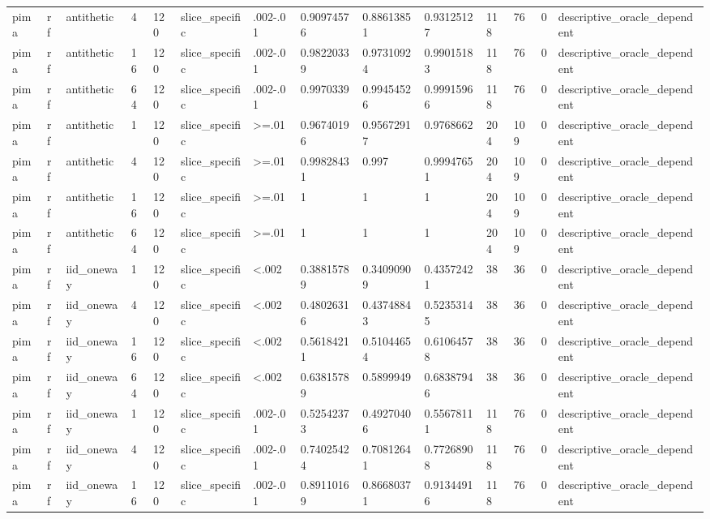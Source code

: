 \begin{tabular}{llllllllllllll}
pima & rf & antithetic & 4 & 120 & slice\_specific & .002-.01 & 0.90974576 & 0.88613851 & 0.93125127 & 118 & 76 & 0 & descriptive\_oracle\_dependent \\
pima & rf & antithetic & 16 & 120 & slice\_specific & .002-.01 & 0.98220339 & 0.97310924 & 0.99015183 & 118 & 76 & 0 & descriptive\_oracle\_dependent \\
pima & rf & antithetic & 64 & 120 & slice\_specific & .002-.01 & 0.9970339 & 0.99454526 & 0.99915966 & 118 & 76 & 0 & descriptive\_oracle\_dependent \\
pima & rf & antithetic & 1 & 120 & slice\_specific & >=.01 & 0.96740196 & 0.95672917 & 0.9768662 & 204 & 109 & 0 & descriptive\_oracle\_dependent \\
pima & rf & antithetic & 4 & 120 & slice\_specific & >=.01 & 0.99828431 & 0.997 & 0.99947651 & 204 & 109 & 0 & descriptive\_oracle\_dependent \\
pima & rf & antithetic & 16 & 120 & slice\_specific & >=.01 & 1 & 1 & 1 & 204 & 109 & 0 & descriptive\_oracle\_dependent \\
pima & rf & antithetic & 64 & 120 & slice\_specific & >=.01 & 1 & 1 & 1 & 204 & 109 & 0 & descriptive\_oracle\_dependent \\
pima & rf & iid\_oneway & 1 & 120 & slice\_specific & <.002 & 0.38815789 & 0.34090909 & 0.43572421 & 38 & 36 & 0 & descriptive\_oracle\_dependent \\
pima & rf & iid\_oneway & 4 & 120 & slice\_specific & <.002 & 0.48026316 & 0.43748843 & 0.52353145 & 38 & 36 & 0 & descriptive\_oracle\_dependent \\
pima & rf & iid\_oneway & 16 & 120 & slice\_specific & <.002 & 0.56184211 & 0.51044654 & 0.61064578 & 38 & 36 & 0 & descriptive\_oracle\_dependent \\
pima & rf & iid\_oneway & 64 & 120 & slice\_specific & <.002 & 0.63815789 & 0.5899949 & 0.68387946 & 38 & 36 & 0 & descriptive\_oracle\_dependent \\
pima & rf & iid\_oneway & 1 & 120 & slice\_specific & .002-.01 & 0.52542373 & 0.49270406 & 0.55678111 & 118 & 76 & 0 & descriptive\_oracle\_dependent \\
pima & rf & iid\_oneway & 4 & 120 & slice\_specific & .002-.01 & 0.74025424 & 0.70812641 & 0.77268908 & 118 & 76 & 0 & descriptive\_oracle\_dependent \\
pima & rf & iid\_oneway & 16 & 120 & slice\_specific & .002-.01 & 0.89110169 & 0.86680371 & 0.91344916 & 118 & 76 & 0 & descriptive\_oracle\_dependent \\

\end{tabular}
